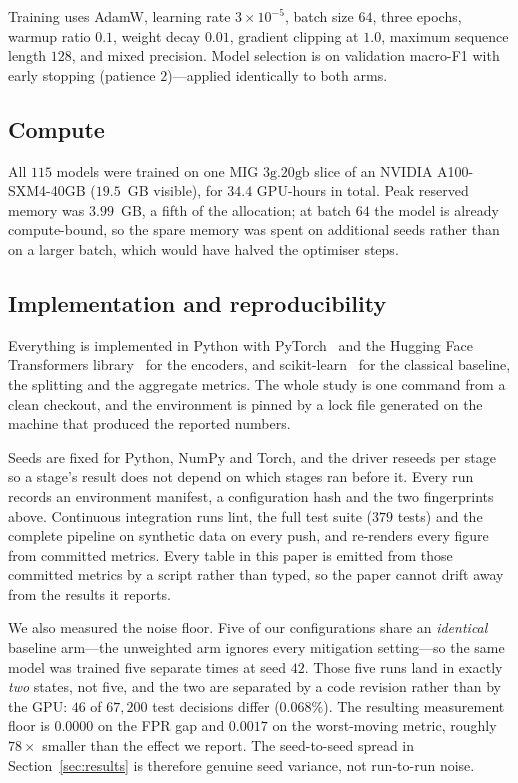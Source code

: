 \documentclass[conference]{IEEEtran}
\begin{document}
Training uses AdamW, learning rate $3\times10^{-5}$, batch size $64$, three
epochs, warmup ratio $0.1$, weight decay $0.01$, gradient clipping at $1.0$,
maximum sequence length $128$, and mixed precision. Model selection is on
validation macro-F1 with early stopping (patience $2$)---applied identically to
both arms.

\subsection{Compute}
All $115$ models were trained on one MIG $3\text{g}.20\text{gb}$ slice of an
NVIDIA A100-SXM4-40GB ($19.5$~GB visible), for $34.4$ GPU-hours in total. Peak
reserved memory was $3.99$~GB, a fifth of the allocation; at batch $64$ the model
is already compute-bound, so the spare memory was spent on additional seeds
rather than on a larger batch, which would have halved the optimiser steps.

\subsection{Implementation and reproducibility}
Everything is implemented in Python with PyTorch~\cite{paszke2019} and the
Hugging Face Transformers library~\cite{wolf2020} for the encoders, and
scikit-learn~\cite{pedregosa2011} for the classical baseline, the splitting and
the aggregate metrics. The whole study is one command from a clean checkout, and
the environment is pinned by a lock file generated on the machine that produced
the reported numbers.

Seeds are fixed for Python, NumPy and Torch, and the driver reseeds per stage so
a stage's result does not depend on which stages ran before it. Every run records
an environment manifest, a configuration hash and the two fingerprints above.
Continuous integration runs lint, the full test suite ($379$ tests) and the
complete pipeline on synthetic data on every push, and re-renders every figure
from committed metrics. Every table in this paper is emitted from those committed
metrics by a script rather than typed, so the paper cannot drift away from the
results it reports.

We also measured the noise floor. Five of our configurations share an
\emph{identical} baseline arm---the unweighted arm ignores every mitigation
setting---so the same model was trained five separate times at seed $42$. Those
five runs land in exactly \emph{two} states, not five, and the two are separated
by a code revision rather than by the GPU: $46$ of $67{,}200$ test decisions
differ ($0.068\%$). The resulting measurement floor is $0.0000$ on the FPR gap
and $0.0017$ on the worst-moving metric, roughly $78\times$ smaller than the
effect we report. The seed-to-seed spread in Section~\ref{sec:results} is
therefore genuine seed variance, not run-to-run noise.
\end{document}
